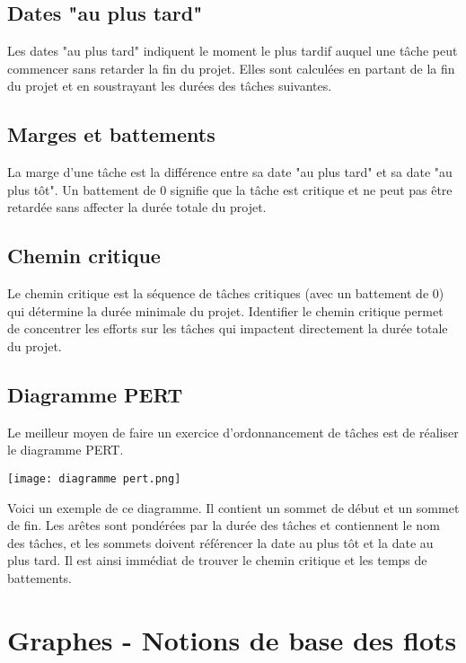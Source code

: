 \documentclass[10pt,a4paper]{article}
\begin{document}
\subsection*{Dates "au plus tard"}
Les dates "au plus tard" indiquent le moment le plus tardif auquel une tâche peut commencer sans retarder la fin du projet. Elles sont calculées en partant de la fin du projet et en soustrayant les durées des tâches suivantes.

\subsection*{Marges et battements}
La marge d'une tâche est la différence entre sa date "au plus tard" et sa date "au plus tôt". Un battement de 0 signifie que la tâche est critique et ne peut pas être retardée sans affecter la durée totale du projet.

\subsection*{Chemin critique}
Le chemin critique est la séquence de tâches critiques (avec un battement de 0) qui détermine la durée minimale du projet. Identifier le chemin critique permet de concentrer les efforts sur les tâches qui impactent directement la durée totale du projet.

\subsection*{Diagramme PERT}
Le meilleur moyen de faire un exercice d'ordonnancement de tâches est de réaliser le diagramme PERT.

\texttt{[image: diagramme pert.png]}

Voici un exemple de ce diagramme. Il contient un sommet de début et un sommet de fin. Les arêtes sont pondérées par la durée des tâches et contiennent le nom des tâches, et les sommets doivent référencer la date au plus tôt et la date au plus tard. Il est ainsi immédiat de trouver le chemin critique et les temps de battements.

\section*{Graphes - Notions de base des flots}
\end{document}
